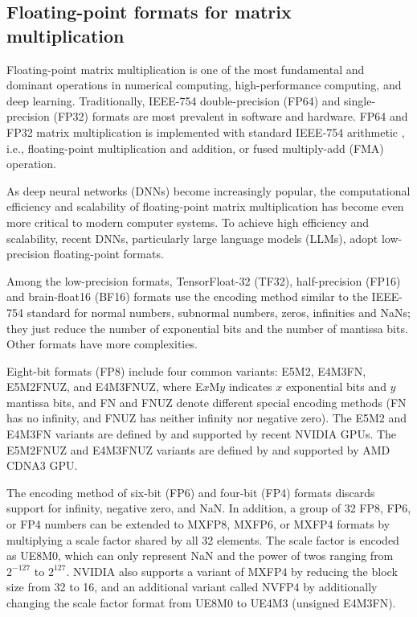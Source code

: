 \appendix
\label{sec:appendix}

\subsection{Floating-point formats for matrix multiplication}
\label{ssec:FPformat}

Floating-point matrix multiplication is one of the most fundamental and dominant operations in numerical computing, high-performance computing, and deep learning. Traditionally, IEEE-754 double-precision (FP64) and single-precision (FP32) formats are most prevalent in software and hardware. FP64 and FP32 matrix multiplication is implemented with standard IEEE-754 arithmetic \cite{ieee_ieee_2019}, i.e., floating-point multiplication and addition, or fused multiply-add (FMA) operation.

As deep neural networks (DNNs) become increasingly popular, the computational efficiency and scalability of floating-point matrix multiplication has become even more critical to modern computer systems. To achieve high efficiency and scalability, recent DNNs, particularly large language models (LLMs), adopt low-precision floating-point formats.

Among the low-precision formats, TensorFloat-32 (TF32), half-precision (FP16) and brain-float16 (BF16) formats use the encoding method similar to the IEEE-754 standard for normal numbers, subnormal numbers, zeros, infinities and NaNs; they just reduce the number of exponential bits and the number of mantissa bits. Other formats have more complexities.

Eight-bit formats (FP8) include four common variants: E5M2, E4M3FN, E5M2FNUZ, and E4M3FNUZ, where E$x$M$y$ indicates $x$ exponential bits and $y$ mantissa bits, and FN and FNUZ denote different special encoding methods (FN has no infinity, and FNUZ has neither infinity nor negative zero). The E5M2 and E4M3FN variants are defined by \cite{micikevicius_fp8_2022,open_compute_project_ocp_2023} and supported by recent NVIDIA GPUs. The E5M2FNUZ and E4M3FNUZ variants are defined by \cite{noune_8-bit_2022} and supported by AMD CDNA3 GPU.

The encoding method of six-bit (FP6) and four-bit (FP4) formats discards support for infinity, negative zero, and NaN. In addition, a group of 32 FP8, FP6, or FP4 numbers can be extended to MXFP8, MXFP6, or MXFP4 formats \cite{open_compute_project_ocp_2023} by multiplying a scale factor shared by all 32 elements. The scale factor is encoded as UE8M0, which can only represent NaN and the power of twos ranging from $2^{-127}$ to $2^{127}$. NVIDIA also supports a variant of MXFP4 by reducing the block size from 32 to 16, and an additional variant called NVFP4 by additionally changing the scale factor format from UE8M0 to UE4M3 (unsigned E4M3FN).

